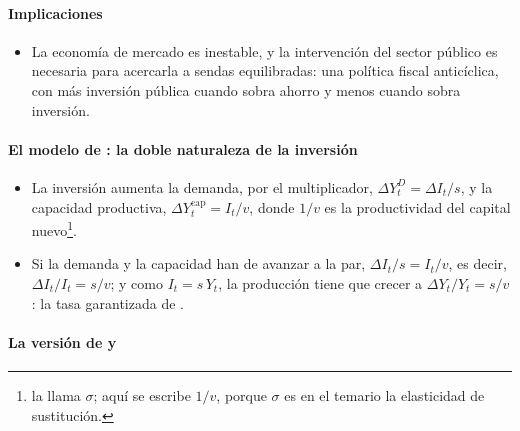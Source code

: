 \documentclass[11pt]{article}
\begin{document}
\paragraph{Implicaciones}

\begin{itemize}
\item La economía de mercado es inestable, y la intervención del sector público es necesaria para acercarla a sendas equilibradas: una política fiscal anticíclica, con más inversión pública cuando sobra ahorro y menos cuando sobra inversión.
\end{itemize}

\paragraph{El modelo de : la doble naturaleza de la inversión}

\begin{itemize}
\item La inversión aumenta la demanda, por el multiplicador, $\Delta Y^D_t=\Delta I_t/s$, y la capacidad productiva, $\Delta Y^{\mathrm{cap}}_t=I_t/v$, donde $1/v$ es la productividad del capital nuevo\footnote{ la llama $\sigma$; aquí se escribe $1/v$, porque $\sigma$ es en el temario la elasticidad de sustitución.}.
\item Si la demanda y la capacidad han de avanzar a la par, $\Delta I_t/s=I_t/v$, es decir, $\Delta I_t/I_t=s/v$; y como $I_t=s\,Y_t$, la producción tiene que crecer a $\Delta Y_t/Y_t=s/v$: la tasa garantizada de .
\end{itemize}

\paragraph{La versión de  y }
\end{document}
